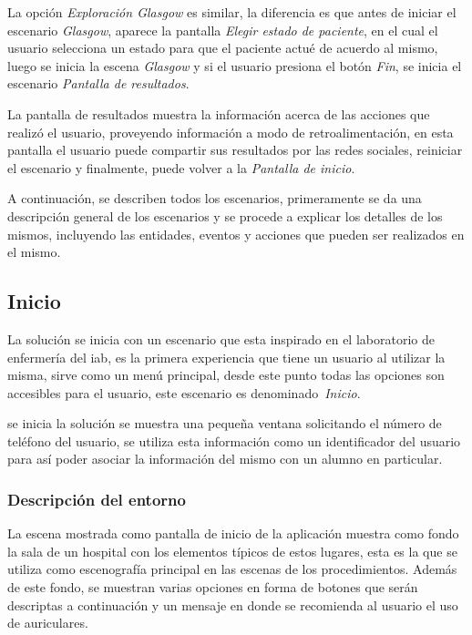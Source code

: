 La opción \emph{Exploración Glasgow} es similar, la diferencia es que antes de
iniciar el escenario \emph{Glasgow}, aparece la pantalla \emph{Elegir estado de
    paciente}, en el cual el usuario selecciona un estado para que el paciente
actué de acuerdo al mismo, luego se inicia la escena \emph{Glasgow} y si el
usuario presiona el botón \emph{Fin}, se inicia el escenario \emph{Pantalla de
    resultados}.

La pantalla de resultados muestra la información acerca de las acciones que
realizó el usuario, proveyendo información a modo de retroalimentación, en esta
pantalla el usuario puede compartir sus resultados por las redes sociales,
reiniciar el escenario y finalmente, puede volver a la \emph{Pantalla de
    inicio}.

A continuación, se describen todos los escenarios, primeramente se da una 
descripción general de los escenarios y se procede a explicar los detalles 
de los mismos, incluyendo las entidades, eventos y acciones que pueden ser realizados 
en el mismo.


\subsection{Inicio}

La solución se inicia con un escenario que esta inspirado en el laboratorio de
enfermería del \Gls{iab}, es la primera experiencia que tiene un
usuario al utilizar la misma, sirve como un menú principal, desde
este punto todas las opciones son accesibles para el usuario, este escenario es
denominado~\emph{Inicio}.

 se inicia la solución se muestra una pequeña ventana
solicitando el número de teléfono del usuario, se utiliza esta información como un
identificador del usuario para así poder asociar la información del mismo con un
alumno en particular.

\subsubsection{Descripción del entorno}
\label{sec:inicio_descripcion}


La escena mostrada como pantalla de inicio de la aplicación muestra como fondo
la sala de un hospital con los elementos típicos de estos lugares, esta es la
que se utiliza como escenografía principal en las escenas de los procedimientos.
Además de este fondo, se muestran varias opciones en forma de botones que serán
descriptas a continuación y un mensaje en donde se recomienda al usuario el uso
de auriculares.

